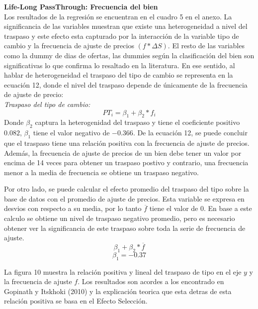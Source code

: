 \documentclass[12pt,a4paper,pdflatex]{article}
\begin{document}
\textbf{Life-Long PassThrough: Frecuencia del bien} \\
Los resultados de la regresión se encuentran en el cuadro 5 en el anexo. La significancia de las variables muestran que existe una heterogeneidad a nivel del traspaso y este efecto esta capturado por la interacción de la variable tipo de cambio y la frecuencia de ajuste de precios $(f* \Delta S)$. El resto de las variables como la dummy de dias de ofertas, las dummies según la clasificación del bien son significativas lo que confirma lo resaltado en la literatura.
En ese sentido, al hablar de heterogeneidad el traspaso del tipo de cambio se representa en la ecuación 12, donde el nivel del traspaso depende de únicamente de la frecuencia de ajuste de precio:\\
\emph{Traspaso del tipo de cambio:\\}
\begin{equation}
PT_{i} = \beta_{1} + \beta_{2}*f_{i}
\end{equation}
Donde $\beta_{2}$ captura la heterogenidad del traspaso y tiene el coeficiente positivo $0.082$, $\beta_{1}$ tiene el valor negativo de $-0.366$. De la ecuación 12, se puede concluir que el traspaso tiene una relación positiva con la frecuencia de ajuste de precios. Además, la frecuencia de ajuste de precios de un bien debe tener un valor por encima de 14 veces para obtener un traspaso postivo y contrario, una frecuencia menor a la media de frecuencia se obtiene un traspaso negativo.

Por otro lado, se puede calcular el efecto promedio del traspaso del tipo sobre la base de datos con el promedio de ajuste de precios. Esta variable se expresa en desvios con respecto a su media, por lo tanto $\overline f$ tiene el valor de 0. En base a este calculo se obtiene un nivel de traspaso negativo promedio, pero es necesario obtener ver la significancia de este traspaso sobre toda la serie de frecuencia de ajuste.
\begin{equation}
\beta_{1} + \beta_{2}*\overline f
\end{equation}
\begin{equation}
\beta_{1} = -0.37
\end{equation}

La figura 10 muestra la relación positiva y lineal del traspaso de tipo en el eje $y$ y la frecuencia de ajuste $f$. Los resultados son acordes a los encontrado en Gopinath y Itskhoki (2010) y la explicación teorica que esta detras de esta relación positiva se basa en el Efecto Selección.
\end{document}
